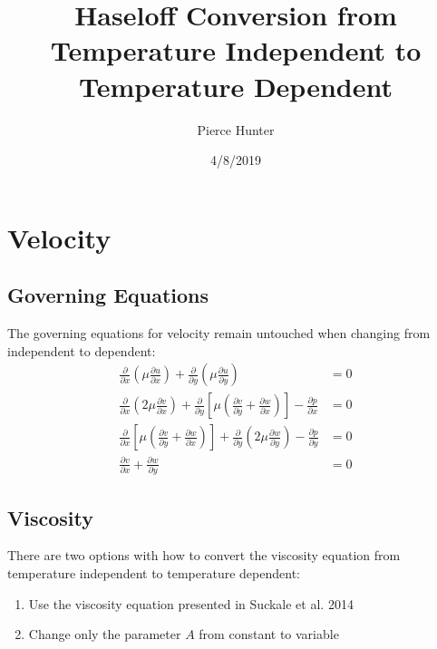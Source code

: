 \documentclass[10pt, letterpaper, twoside]{article}
\title{Haseloff Conversion from Temperature Independent to Temperature Dependent}
\author{Pierce Hunter}
\date{4/8/2019}
\newcommand{\pd}[2]{\frac{\partial#1}{\partial#2}}
\begin{document}
	\maketitle
	
	\section{Velocity}
	\subsection{Governing Equations}
	The governing equations for velocity remain untouched when changing from independent to dependent:
	\begin{align*}
		\pd{}{x}\left(\mu\pd{u}{x}\right) + \pd{}{y}\left(\mu\pd{u}{y}\right)& = 0\\
		\pd{}{x}\left(2\mu\pd{v}{x}\right) + \pd{}{y}\left[\mu\left(\pd{v}{y}+\pd{w}{x}\right)\right] - \pd{p}{x}& = 0\\
		\pd{}{x}\left[\mu\left(\pd{v}{y}+\pd{w}{x}\right)\right] + \pd{}{y}\left(2\mu\pd{w}{y}\right) - \pd{p}{y}& = 0\\
		\pd{v}{x} + \pd{w}{y}& = 0
	\end{align*}
	\subsection{Viscosity}
	There are two options with how to convert the viscosity equation from temperature independent to temperature dependent:
	\begin{enumerate}
		\item Use the viscosity equation presented in Suckale et al. 2014
		\item Change only the parameter $ A $ from constant to variable
	\end{enumerate}
\end{document}
